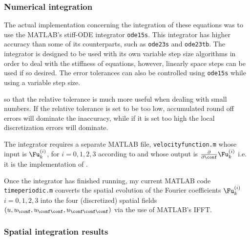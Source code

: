 \subsubsection{Numerical integration}
\label{sect:MNGspatInt}

The actual implementation concerning the integration of these equations was to use the MATLAB's stiff-ODE integrator \texttt{ode15s}. This integrator has higher accuracy than some of its counterparts, such as \texttt{ode23s} and \texttt{ode23tb}. The integrator is designed to be used with its own variable step size algorithms in order to deal with the stiffness of equations, however, linearly space steps can be used if so desired. The error tolerances can also be controlled using \texttt{ode15s} while using a variable step size.

so that the relative tolerance is much more useful when dealing with small numbers. If the relative tolerance is set to be too low, accumulated round off errors will dominate the inaccuracy, while if it is set too high the local discretization errors will dominate.

The integrator requires a separate MATLAB file, \texttt{velocityfunction.m} whose input is $\Fu^{(i)}_{k}$, for $i = 0,1,2,3$ according to  and whose output is $\frac{\partial}{\partial \conf}\Fu^{(i)}_{k}$ i.e. it is the implementation of .

Once the integrator has finished running, my current MATLAB code
\\
\texttt{timeperiodic.m} converts the spatial evolution of the Fourier
coefficients $\Fu_k^{(i)}$ $i = 0,1,2,3$ into the four (discretized)
spatial fields $(u,
u_\conf, u_{\conf \conf}, u_{\conf \conf \conf})$ via the use of
MATLAB's IFFT.

\subsubsection{Spatial integration results}

